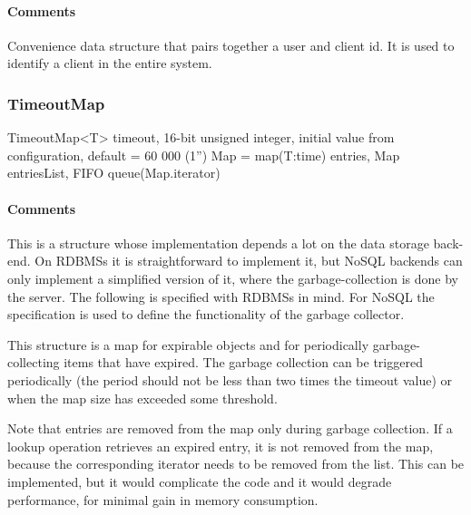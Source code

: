 \documentclass[a4paper,10pt]{article}
\begin{document}
\begin{inparaitem}[ ]
 \item \infrastructure
\end{inparaitem}

\paragraph*{Comments}
Convenience data structure that pairs together a user and client id. It is used to identify a client in the entire system.

\subsubsection{TimeoutMap}

\begin{verbbox}
TimeoutMap<T>
{
  timeout, 16-bit unsigned integer,
    initial value from configuration, default = 60 000 (1'')
  Map = map(T:time)
  entries, Map
  entriesList, FIFO queue(Map.iterator)
}
\end{verbbox}
\begin{center}
\theverbbox
\end{center}

\begin{inparaitem}[ ]
 \item \infrastructure
\end{inparaitem}

\paragraph*{Comments}
This is a structure whose implementation depends a lot on the data storage back-end. On RDBMSs it is straightforward to implement it, but NoSQL backends can only implement a 
simplified version of it, where the garbage-collection is done by the server. The following is specified with RDBMSs in mind. For NoSQL the specification is used to define the 
functionality of the garbage collector.

This structure is a map for expirable objects and for periodically garbage-collecting items that have expired. The garbage collection can be triggered periodically (the period 
should not be less than two times the timeout value) or when the map size has exceeded some threshold.

Note that entries are removed from the map only during garbage collection. If a lookup operation retrieves an expired entry, it is not removed from the map, because the 
corresponding iterator needs to be removed from the list. This can be implemented, but it would complicate the code and it would degrade performance, for minimal gain in memory 
consumption.
\end{document}
